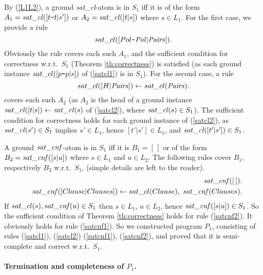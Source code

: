 \documentclass{tlp}
\newcommand*{\mydash}{{\mbox{\tt-}}}
\begin{document}
By (\ref{L1L2}),
a ground {\it sat\_cl}-atom is in $S_1$ iff it is of the form
$A_1 = {\it sat\_cl}([t\mydash t|s'])$ or
$A_2 = {\it sat\_cl}([t|s])$ where $s\in L_1$.
For the first case, we provide a rule\begin{equation}
  sat\_cl([Pol\mydash {\it Pol} | {\it Pairs}]). 
  \label{satcl1}
\end{equation}
Obviously the rule covers each such  $A_1$, and the sufficient condition for
correctness w.r.t.\ $S_1$ (Theorem \ref{th:correctness}) is satisfied
(as each ground instance $sat\_cl([p\mydash p|s])$ of
(\ref{satcl1}) is in $S_1$).
For the second case, a rule
{\sloppy
    \begin{equation}
          sat\_cl([  H            | {\it Pairs}]) \gets 
            sat\_cl({\it Pairs}).
    \label{satcl2}
    \end{equation}
}covers each such $A_2$
(as $A_2$ is the head of a ground instance
$ {\it sat\_cl}([t | s]) \gets {\it sat\_cl}(s) $ of (\ref{satcl2}),
where  ${\it sat\_cl}(s)\in S_1$).
The sufficient condition for correctness holds for each ground instance of 
(\ref{satcl2}), as  ${\it sat\_cl}(s')\in S_1$ implies 
$s'\in L_1$, hence $[t'|s']\in L_1$, and ${\it sat\_cl}([t'|s'])\in S_1$.








A ground ${\it sat\_c n f}$-atom is in $S_1$ iff it is $B_1=[\,]$ or of the form
$B_2 = {\it sat\_c n f}([s|u])$ where $s\in L_1$ and $u\in L_2$.
The following rules cover  $B_1$, respectively $B_2$ w.r.t.\ $S_1$, 
(simple details are left to the reader).
\begin{eqnarray}
&&
{\it sat\_c n f}([\,]). \label{satcnf1}  \\
&&
{\it sat\_c n f}([Clause | Clauses]) \gets
sat\_cl(Clause),
\ {\it sat\_c n f}(Clauses). \label{satcnf2}  
\end{eqnarray}
If $sat\_cl(s),  {\it sat\_c n f}(u) \in S_1$ then $s\in L_1$, $u\in L_2$,
hence ${\it sat\_c n f}([s |u])\in S_1$.
So the sufficient condition of Theorem \ref{th:correctness}
holds for rule (\ref{satcnf2}).  It obviously holds for rule (\ref{satcnf1}).
So we constructed program $P_1$, consisting of rules
(\ref{satcl1}), (\ref{satcl2})
(\ref{satcnf1}), (\ref{satcnf2}), and proved that it is semi-complete and
correct w.r.t.\ $S_1$.


\paragraph{Termination and completeness of $P_1$.}
\end{document}
